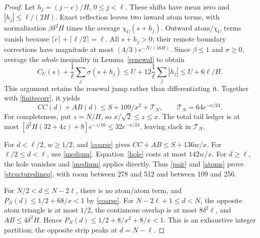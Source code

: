 \begin{proof}
Let \(h_j=(j-c)/H\), \(0\le j<\ell\). These shifts have mean zero and
\(|h_j|\le\ell/(2H)\). Exact reflection leaves two inward atom terms,
with normalization \(\beta\delta^2H\) times the average
\(\chi_U(s+h_j)\). Outward atom/\(\chi_U\) terms vanish because
\(\lceil c\rceil+\lceil\ell/2\rceil=\ell\).
All \(s+h_j>0\); their remote boundary corrections have magnitude at most
\((4/3)e^{-N/(16H)}\). Since \(\beta\le1\) and \(\sigma\ge0\), average
the \emph{whole} inequality in Lemma~\ref{renewal} to obtain
\[
 C_U(s)+\frac1\ell\sum_j\sigma(s+h_j)
 \le U+12\frac1\ell\sum_j|h_j|\le U+6\ell/H.
\]
This argument retains the renewal jump rather than differentiating it.
Together with \eqref{finitecorr}, it yields
\begin{equation}
 CC(d)+AB(d)\le S+109/x^2+\mathcal T_N,
 \qquad \mathcal T_N=64e^{-x/24}. \label{medium}
\end{equation}
For completeness, put \(z=N/H\), so \(x/\sqrt2\le z\le x\).
The total tail ledger is at most
\([\delta^2H(32+4z)+8]e^{-z/16}\le32e^{-x/24}\), leaving slack in
\(\mathcal T_N\).

For \(d<\ell/2\), \(w\ge1/2\), and \eqref{coarse} gives
\(CC+AB\le S+136w/x\). For \(\ell/2\le d<\ell\), use \eqref{medium}.
Equation~\eqref{hole} costs at most \(142w/x\). For \(d\ge\ell\), the
hole vanishes and \eqref{medium} applies directly. Thus
\eqref{pair} and \eqref{atoms} prove \eqref{structuredineq}, with room
between 278 and 512 and between 109 and 256.

For \(N/2<d\le N-2\ell\), there is no atom/atom term, and
\(P_N(d)\le1/2+68/x<1\) by \eqref{coarse}.
For \(N-2\ell+1\le d<N\), the opposite atom triangle is at most \(1/2\),
the continuous overlap is at most \(8\delta^2\ell\), and
\(AB\le4\delta^2H\). Hence \(P_N(d)\le1/2+8/x^2+8/x<1\).
This is an exhaustive integer partition; the opposite strip peaks at
\(d=N-\ell\).
\end{proof}
